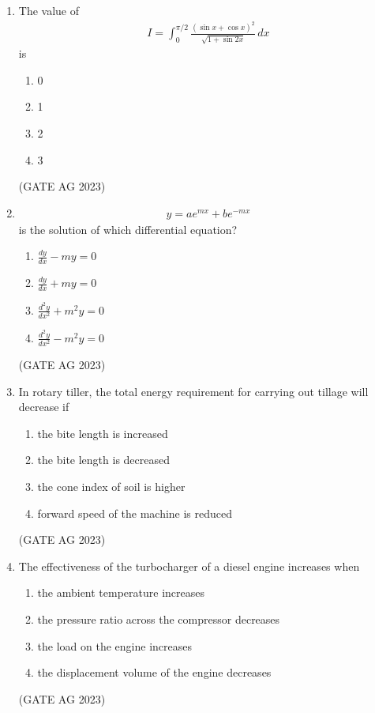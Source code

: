 \documentclass[journal,12pt,onecolumn]{IEEEtran}
\theoremstyle{remark}
\begin{document}
\begin{enumerate}
\item The value of
\begin{align*}
I = \int_0^{\pi/2} \frac{(\sin x + \cos x)^2}{\sqrt{1+\sin 2x}} \, dx
\end{align*}
is
\begin{enumerate}
    \item 0
    \item 1
    \item 2
    \item 3
\end{enumerate}
\hfill{(GATE AG 2023)}

\item 
\begin{align*}
y = ae^{mx} + be^{-mx} 
\end{align*}
is the solution of which differential equation?
\begin{enumerate}
    \item $\tfrac{dy}{dx} - my = 0$
    \item $\tfrac{dy}{dx} + my = 0$
    \item $\tfrac{d^2y}{dx^2} + m^2 y = 0$
    \item $\tfrac{d^2y}{dx^2} - m^2 y = 0$
\end{enumerate}
\hfill{(GATE AG 2023)}

\item In rotary tiller, the total energy requirement for carrying out tillage will decrease if
\begin{enumerate}
    \item the bite length is increased
    \item the bite length is decreased
    \item the cone index of soil is higher
    \item forward speed of the machine is reduced
\end{enumerate}
\hfill{(GATE AG 2023)}

\item The effectiveness of the turbocharger of a diesel engine increases when
\begin{enumerate}
    \item the ambient temperature increases
    \item the pressure ratio across the compressor decreases
    \item the load on the engine increases
    \item the displacement volume of the engine decreases
\end{enumerate}
\hfill{(GATE AG 2023)}


\end{enumerate}
\end{document}
